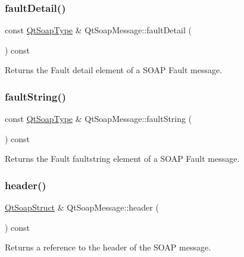 \subsubsection{\texorpdfstring{fault\+Detail()}{faultDetail()}}
{\footnotesize\ttfamily const \mbox{\hyperlink{class_qt_soap_type}{Qt\+Soap\+Type}} \& Qt\+Soap\+Message\+::fault\+Detail (\begin{DoxyParamCaption}{ }\end{DoxyParamCaption}) const}

Returns the Fault detail element of a S\+O\+AP Fault message. \mbox{\label{class_qt_soap_message_a11b95f781994094c764e457f800a3a21}} 
\subsubsection{\texorpdfstring{fault\+String()}{faultString()}}
{\footnotesize\ttfamily const \mbox{\hyperlink{class_qt_soap_type}{Qt\+Soap\+Type}} \& Qt\+Soap\+Message\+::fault\+String (\begin{DoxyParamCaption}{ }\end{DoxyParamCaption}) const}

Returns the Fault faultstring element of a S\+O\+AP Fault message. \mbox{\label{class_qt_soap_message_a4c1ec40db5502f9f54cadcafd4cdc772}} 
\subsubsection{\texorpdfstring{header()}{header()}}
{\footnotesize\ttfamily \mbox{\hyperlink{class_qt_soap_struct}{Qt\+Soap\+Struct}} \& Qt\+Soap\+Message\+::header (\begin{DoxyParamCaption}{ }\end{DoxyParamCaption}) const\hspace{0.3cm}{\ttfamily [protected]}}

Returns a reference to the header of the S\+O\+AP message. \mbox{\label{class_qt_soap_message_a7aa7a55d9f593144499f8622e8aa1ce5}} 
